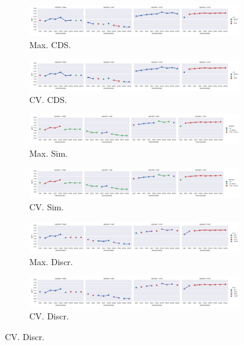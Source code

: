 \begin{landscape}
\begin{figure}
  \begin{subfigure}[t]{0.6\textwidth}
    \includegraphics[width=\textwidth]{supplement/figures/GS11-max_-selection-cds}
    \caption{Max. CDS.}
    \label{fig:}
  \end{subfigure}
  \begin{subfigure}[t]{0.6\textwidth}
    \includegraphics[width=\textwidth]{supplement/figures/GS11-cross_validation-selection-cds}
    \caption{CV. CDS.}
    \label{fig:}
  \end{subfigure}

  \begin{subfigure}[t]{0.6\textwidth}
    \includegraphics[width=\textwidth]{supplement/figures/GS11-max_-selection-similarity}
    \caption{Max. Sim.}
    \label{fig:}
  \end{subfigure}
  \begin{subfigure}[t]{0.6\textwidth}
    \includegraphics[width=\textwidth]{supplement/figures/GS11-cross_validation-selection-similarity}
    \caption{CV. Sim.}
    \label{fig:}
  \end{subfigure}

  \begin{subfigure}[t]{0.6\textwidth}
    \includegraphics[width=\textwidth]{supplement/figures/GS11-max_-selection-discr}
    \caption{Max. Discr.}
    \label{fig:}
  \end{subfigure}
  \begin{subfigure}[t]{0.6\textwidth}
    \includegraphics[width=\textwidth]{supplement/figures/GS11-cross_validation-selection-discr}
    \caption{CV. Discr.}
    \label{fig:}


\end{subfigure}
\end{figure}
\end{landscape}
